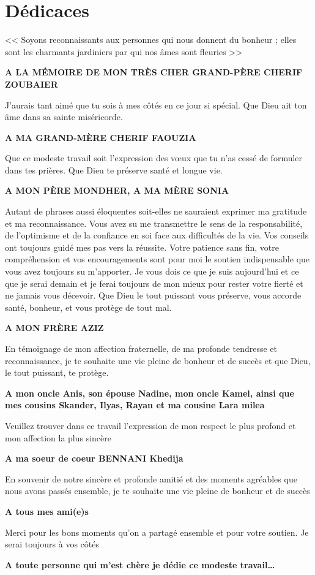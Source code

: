 \chapter*{Dédicaces}
\begin{center}
<<  Soyons reconnaissants aux personnes qui nous donnent du bonheur ; elles sont  les charmants jardiniers par qui nos âmes sont fleuries >>


\bigskip
\textbf{A  LA MÉMOIRE DE MON TRÈS CHER GRAND-PÈRE CHERIF ZOUBAIER}
\bigskip



J’aurais tant aimé que tu sois à mes côtés en ce jour si spécial. Que Dieu ait ton âme dans sa sainte miséricorde.


\bigskip
\textbf{A MA GRAND-MÈRE CHERIF FAOUZIA }
\bigskip


Que ce modeste travail soit l’expression des vœux que tu n’as cessé de formuler dans tes prières. Que Dieu te préserve santé et longue vie.

\bigskip
\textbf{A MON PÈRE  MONDHER, A MA MÈRE SONIA}
\bigskip

Autant de phrases aussi éloquentes soit-elles ne sauraient exprimer ma gratitude et ma reconnaissance. Vous avez su me transmettre le sens de la responsabilité, de l’optimisme et de la confiance en soi face aux difficultés de la vie. Vos conseils ont toujours guidé mes pas vers la réussite. Votre patience sans fin, votre compréhension et vos encouragements sont pour moi le soutien indispensable que vous avez  toujours su m’apporter. Je vous dois ce que je suis aujourd’hui et ce que je serai demain et je ferai toujours de mon mieux pour rester votre fierté et ne jamais vous décevoir. Que Dieu le tout puissant vous préserve, vous accorde santé, bonheur, et vous protège de tout mal.
\bigskip


\textbf{A MON FRÈRE AZIZ}
\bigskip

En témoignage de mon affection fraternelle, de ma profonde tendresse et reconnaissance, je te souhaite une vie pleine de bonheur et de succès et que Dieu, le tout puissant, te protège.


\bigskip
\textbf{A mon oncle Anis, son épouse Nadine, mon oncle Kamel, ainsi que mes cousins Skander, Ilyas, Rayan et ma cousine  Lara milea}
\bigskip

Veuillez trouver dans ce travail l’expression de mon respect le plus profond et mon affection la plus sincère

\newpage
\bigskip
\bigskip
\bigskip
\textbf{A ma soeur de coeur BENNANI Khedija}
\bigskip

En souvenir de notre sincère et profonde amitié et des moments agréables que nous avons passés ensemble, je te souhaite une vie pleine de bonheur et de succès
\bigskip

\textbf{A tous mes ami(e)s}
\bigskip

Merci pour les bons moments qu’on a partagé ensemble et pour votre soutien. Je serai toujours à vos côtés
\bigskip

\textbf{A toute personne qui m'est chère je dédie ce modeste travail…}
\end{center}
